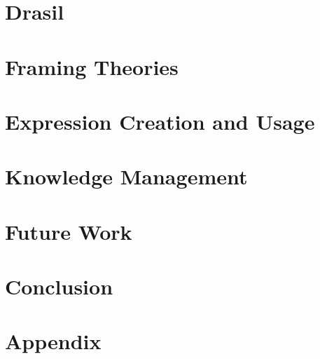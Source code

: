 \documentclass[12pt,oneside]{book}
\begin{document}
\chapter{Drasil}
\label{chap:drasil}


\chapter{Framing Theories}
\label{chap:modelkinds}


\chapter{Expression Creation and Usage}
\label{chap:typedExpr}


\chapter{Knowledge Management}
\label{chap:knowledgeMgmt}


\chapter{Future Work}
\label{chap:futureWork}


\chapter{Conclusion}
\label{chap:conclusion}


\printbibliography[heading=bibintoc]


\backmatter

\appendix
\chapter{Appendix}

\end{document}

